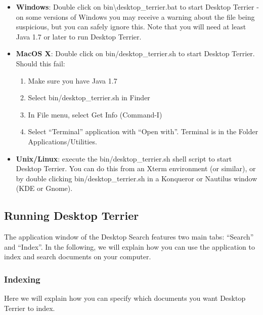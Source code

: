 \begin{itemize}
\tightlist
\item
  \textbf{Windows}: Double click on
  bin\textbackslash{}desktop\_terrier.bat to start Desktop Terrier - on
  some versions of Windows you may receive a warning about the file
  being suspicious, but you can safely ignore this. Note that you will
  need at least Java 1.7 or later to run Desktop Terrier.
\item
  \textbf{MacOS X}: Double click on bin/desktop\_terrier.sh to start
  Desktop Terrier. Should this fail:

  \begin{enumerate}
  \tightlist
  \item
    Make sure you have Java 1.7
  \item
    Select bin/desktop\_terrier.sh in Finder
  \item
    In File menu, select Get Info (Command-I)
  \item
    Select ``Terminal'' application with ``Open with''. Terminal is in
    the Folder Applications/Utilities.
  \end{enumerate}
\item
  \textbf{Unix/Linux}: execute the bin/desktop\_terrier.sh shell script
  to start Desktop Terrier. You can do this from an Xterm environment
  (or similar), or by double clicking bin/desktop\_terrier.sh in a
  Konqueror or Nautilus window (KDE or Gnome).
\end{itemize}

\subsection{Running Desktop Terrier}\label{running-desktop-terrier}

The application window of the Desktop Search features two main tabs:
``Search'' and ``Index''. In the following, we will explain how you can
use the application to index and search documents on your computer.

\subsubsection{Indexing}\label{indexing}

Here we will explain how you can specify which documents you want
Desktop Terrier to index.

